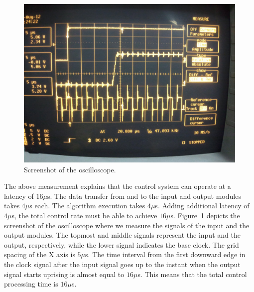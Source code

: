\begin{figure}[t]
 \centering
 \includegraphics[width=\hsize]{eps/oscilloscope.eps}
 \caption{Screenshot of the oscilloscope.}
 \label{fig:oscilloscope}
\end{figure}

The above measurement explains that the control system can operate at a
latency of $16\mu$s.
The data transfer from and to the input and output modules takes $4\mu$s
each.
The algorithm execution takes $4\mu$s.
Adding additional latency of $4\mu$s, the total control rate must be
able to achieve $16\mu$s.
Figure~\ref{fig:oscilloscope} depicts the screenshot of the oscilloscope
where we measure the signals of the input and the output modules.
The topmost and middle signals represent the input and the output,
respectively, while the lower signal indicates the base clock.
The grid spacing of the X axis is $5\mu$s.
The time interval from the first downward edge in the clock signal after
the input signal goes up to the instant when the output signal starts
uprising is almost equal to $16\mu$s.
This means that the total control processing time is $16\mu$s. 

